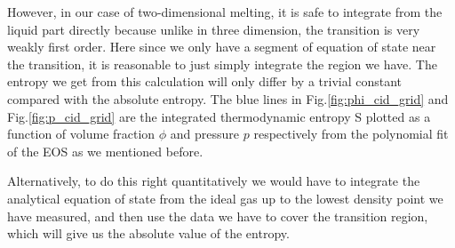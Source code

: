 \documentclass[a4paper]{article}
\begin{document}
However, in our case of two-dimensional melting, it is safe to integrate from the liquid part directly because unlike in three dimension, the transition is very weakly first order. Here since we only have a segment of equation of state near the transition, it is reasonable to just simply integrate the region we have. The entropy we get from this calculation will only differ by a trivial constant compared with the absolute entropy. The blue lines in Fig.\ref{fig:phi_cid_grid} and Fig.\ref{fig:p_cid_grid} are the integrated thermodynamic entropy S plotted as a function of volume fraction $\phi$ and pressure $p$ respectively from the polynomial fit of the EOS as we mentioned before.

Alternatively, to do this right quantitatively we would have to integrate the analytical equation of state from the ideal gas up to the lowest density point we have measured, and then use the data we have to cover the transition region, which will give us the absolute value of the entropy. 
\end{document}
